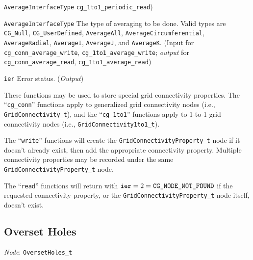 \begin{Ventryi}{\texttt{AverageInterfaceType}}
      \texttt{cg\_1to1\_periodic\_read})
\item [\texttt{AverageInterfaceType}]
      The type of averaging to be done.
      Valid types are \texttt{CG\_Null}, \texttt{CG\_UserDefined}, \texttt{AverageAll},
      \texttt{AverageCircumferential}, \texttt{AverageRadial}, \texttt{AverageI},
      \texttt{AverageJ}, and \texttt{AverageK}.
      (\textcolor{input}{Input} for \texttt{cg\_conn\_average\_write},
      \texttt{cg\_1to1\_average\_write};
      \textcolor{output}{\textit{output}} for \texttt{cg\_conn\_average\_read},
      \texttt{cg\_1to1\_average\_read})
\item [\texttt{ier}]
      Error status.
      (\textcolor{output}{\textit{Output}})
\end{Ventryi}

These functions may be used to store special grid connectivity properties.
The ``\texttt{cg\_conn}'' functions apply to generalized grid
connectivity nodes (i.e., \texttt{GridConnectivity\_t}), and the
``\texttt{cg\_1to1}'' functions apply to 1-to-1 grid connectivity nodes
(i.e., \texttt{GridConnectivity1to1\_t}).

The ``\texttt{write}'' functions will create the
\texttt{GridConnectivityProperty\_t} node if it doesn't already exist,
then add the appropriate connectivity property.
Multiple connectivity properties may be recorded under the same
\texttt{GridConnectivityProperty\_t} node.

The ``\texttt{read}'' functions will return with $\text{\texttt{ier}} = 2 =
\text{\texttt{CG\_NODE\_NOT\_FOUND}}$ if the requested connectivity property,
or the \texttt{GridConnectivityProperty\_t} node itself, doesn't exist.

\newpage
\subsection{Overset Holes}
\label{s:overset}

\noindent
\textit{Node}: \texttt{OversetHoles\_t}

